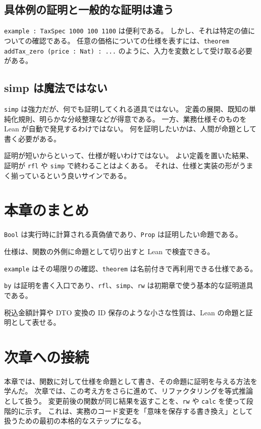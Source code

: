 \subsection{具体例の証明と一般的な証明は違う}

\texttt{example : TaxSpec 1000 100 1100} は便利である。
しかし、それは特定の値についての確認である。
任意の価格についての仕様を表すには、\texttt{theorem addTax\_zero (price : Nat) : ...} のように、入力を変数として受け取る必要がある。

\subsection{simp は魔法ではない}

\texttt{simp} は強力だが、何でも証明してくれる道具ではない。
定義の展開、既知の単純化規則、明らかな分岐整理などが得意である。
一方、業務仕様そのものを Lean が自動で発見するわけではない。
何を証明したいかは、人間が命題として書く必要がある。

\begin{warningbox}
証明が短いからといって、仕様が軽いわけではない。
よい定義を置いた結果、証明が \texttt{rfl} や \texttt{simp} で終わることはよくある。
それは、仕様と実装の形がうまく揃っているという良いサインである。
\end{warningbox}

\section{本章のまとめ}

\texttt{Bool} は実行時に計算される真偽値であり、\texttt{Prop} は証明したい命題である。

仕様は、関数の外側に命題として切り出すと Lean で検査できる。

\texttt{example} はその場限りの確認、\texttt{theorem} は名前付きで再利用できる仕様である。

\texttt{by} は証明を書く入口であり、\texttt{rfl}、\texttt{simp}、\texttt{rw} は初期章で使う基本的な証明道具である。

税込金額計算や DTO 変換の ID 保存のような小さな性質は、Lean の命題と証明として表せる。

\section{次章への接続}

本章では、関数に対して仕様を命題として書き、その命題に証明を与える方法を学んだ。
次章では、この考え方をさらに進めて、リファクタリングを等式推論として扱う。
変更前後の関数が同じ結果を返すことを、\texttt{rw} や \texttt{calc} を使って段階的に示す。
これは、実務のコード変更を「意味を保存する書き換え」として扱うための最初の本格的なステップになる。
